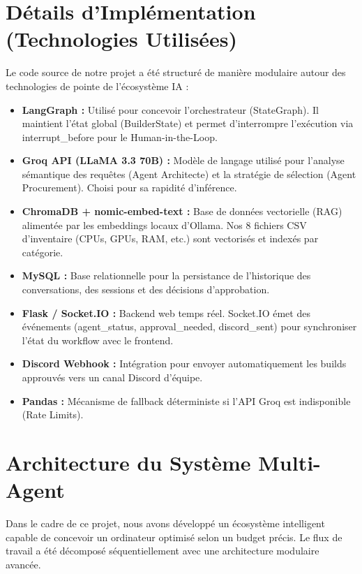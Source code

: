 \documentclass[12pt,a4paper]{article}
\begin{document}
\section{D\'etails d'Impl\'ementation (Technologies Utilis\'ees)}
Le code source de notre projet a \'et\'e structur\'e de mani\`ere modulaire autour des technologies de pointe de l'\'ecosyst\`eme IA :
\begin{itemize}
    \item \textbf{LangGraph :} Utilis\'e pour concevoir l'orchestrateur (StateGraph). Il maintient l'\'etat global (BuilderState) et permet d'interrompre l'ex\'ecution via interrupt\_before pour le Human-in-the-Loop.
    \item \textbf{Groq API (LLaMA 3.3 70B) :} Mod\`ele de langage utilis\'e pour l'analyse s\'emantique des requ\^etes (Agent Architecte) et la strat\'egie de s\'election (Agent Procurement). Choisi pour sa rapidit\'e d'inf\'erence.
    \item \textbf{ChromaDB + nomic-embed-text :} Base de donn\'ees vectorielle (RAG) aliment\'ee par les embeddings locaux d'Ollama. Nos 8 fichiers CSV d'inventaire (CPUs, GPUs, RAM, etc.) sont vectoris\'es et index\'es par cat\'egorie.
    \item \textbf{MySQL :} Base relationnelle pour la persistance de l'historique des conversations, des sessions et des d\'ecisions d'approbation.
    \item \textbf{Flask / Socket.IO :} Backend web temps r\'eel. Socket.IO \'emet des \'ev\'enements (agent\_status, approval\_needed, discord\_sent) pour synchroniser l'\'etat du workflow avec le frontend.
    \item \textbf{Discord Webhook :} Int\'egration pour envoyer automatiquement les builds approuv\'es vers un canal Discord d'\'equipe.
    \item \textbf{Pandas :} M\'ecanisme de fallback d\'eterministe si l'API Groq est indisponible (Rate Limits).
\end{itemize}

\section{Architecture du Syst\`eme Multi-Agent}
Dans le cadre de ce projet, nous avons d\'evelopp\'e un \'ecosyst\`eme intelligent capable de concevoir un ordinateur optimis\'e selon un budget pr\'ecis. Le flux de travail a \'et\'e d\'ecompos\'e s\'equentiellement avec une architecture modulaire avanc\'ee.
\end{document}
